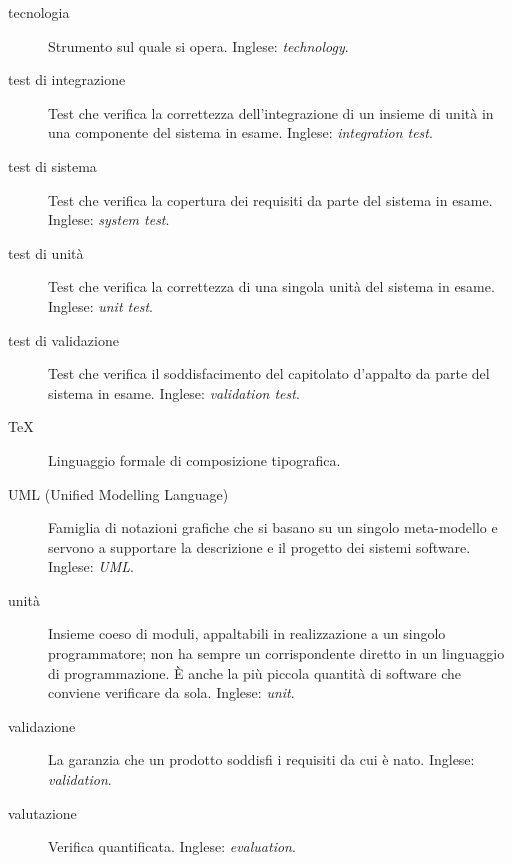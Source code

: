 \documentclass[a4paper]{article}
\begin{document}
\begin{description}
	\item[tecnologia] 

			Strumento sul quale si opera. Inglese: \emph{technology}.
			
	\item[test di integrazione] 

			Test che verifica la correttezza dell'integrazione di un insieme di unità in una componente del sistema in esame. Inglese: \emph{integration test}.
			
	\item[test di sistema] 

			Test che verifica la copertura dei requisiti da parte del sistema in esame. Inglese: \emph{system test}.
			
	\item[test di unità] 

			Test che verifica la correttezza di una singola unità del sistema in esame. Inglese: \emph{unit test}.
			
	\item[test di validazione] 

			Test che verifica il soddisfacimento del capitolato d'appalto da parte del sistema in esame. Inglese: \emph{validation test}.
			
	\item[TeX] 

			Linguaggio formale di composizione tipografica.
			
	\item[UML (Unified Modelling Language)] 

			Famiglia di notazioni grafiche che si basano su un singolo meta-modello e servono a supportare la descrizione e il progetto dei sistemi software. Inglese: \emph{UML}.
			
	\item[unità] 

			Insieme coeso di moduli, appaltabili in realizzazione a un singolo programmatore; non ha sempre un corrispondente diretto in un linguaggio di programmazione. È anche la più piccola quantità di software che conviene verificare da sola. Inglese: \emph{unit}.
			
	\item[validazione] 

			La garanzia che un prodotto soddisfi i requisiti da cui è nato. Inglese: \emph{validation}.
			
	\item[valutazione] 

			Verifica quantificata. Inglese: \emph{evaluation}.
			

\end{description}
\end{document}
